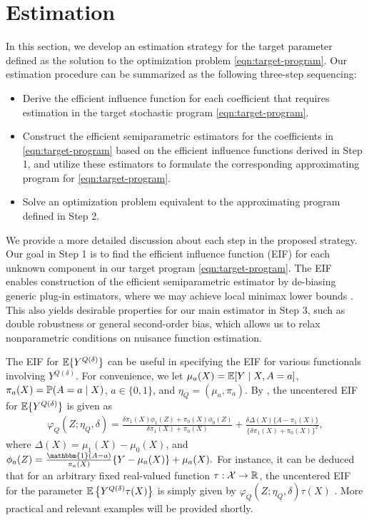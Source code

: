 \section{Estimation}

In this section, we develop an estimation strategy for the target parameter defined as the solution to the optimization problem \eqref{eqn:target-program}. Our estimation procedure can be summarized as the following three-step sequencing:
\begin{itemize}
    \item [\textbf{Step 1.}] Derive the efficient influence function for each coefficient that requires estimation in the target stochastic program \eqref{eqn:target-program}.
    \item [\textbf{Step 2.}] Construct the efficient semiparametric estimators for the coefficients in \eqref{eqn:target-program} based on the efficient influence functions derived in Step 1, and utilize these estimators to formulate the corresponding approximating program for \eqref{eqn:target-program}.
    \item [\textbf{Step 3.}] Solve an optimization problem equivalent to the approximating program defined in Step 2.
\end{itemize}

We provide a more detailed discussion about each step in the proposed strategy. Our goal in Step 1 is to find the efficient influence function (EIF) for each unknown component in our target program \eqref{eqn:target-program}. 
The EIF enables construction of the efficient semiparametric estimator by de-biasing generic plug-in estimators, where we may achieve local minimax lower bounds \citep{bickel1993efficient, van2002semiparametric,tsiatis2006semiparametric,kennedy2016semiparametric}. This also yields desirable properties for our main estimator in Step 3, such as double robustness or general second-order bias, which allows us to relax nonparametric conditions on nuisance function estimation. 

The EIF for $\mathbb{E}\{Y^{Q(\delta)}\}$ can be useful in specifying the EIF for various functionals involving $Y^{Q(\delta)}$. For convenience, we let $\mu_a(X) = \mathbb{E}[Y \mid X,A=a]$, $\pi_a(X) = \mathbb{P}(A=a \mid X)$, $a \in \{0,1\}$, and $\eta_Q=(\mu_a,\pi_a)$. By \citet[][Theorem 2]{kennedy2019nonparametric}, the uncentered EIF for $\mathbb{E}\{Y^{Q(\delta)}\}$ is given as
\begin{align} \label{eqn:EIF-incremental-effect}
\varphi_Q(Z;\eta_Q,\delta) = \frac{\delta \pi_1(X) \phi_1(Z) +  \pi_0(X)\phi_0(Z)}{\delta \pi_1(X) + \pi_0(X)}
+ \frac{\delta \Delta(X) \{ A - \pi_1(X) \}}{\{ \delta \pi_1(X) + \pi_0(X) \}^2},
\end{align}
where $\Delta(X) = \mu_1(X) - \mu_0(X)$, and
$
\phi_a(Z) = \frac{\mathbbm{1}(A = a)}{\pi_a(X)} \{ Y - \mu_a(X) \} + \mu_a(X).
$
For instance, it can be deduced that for an arbitrary fixed real-valued function $\tau:\mathcal{X} \rightarrow \mathbb{R}$, the uncentered EIF for the parameter $\mathbb{E}\left\{Y^{Q(\delta)}\tau(X)\right\}$ is simply given by $\varphi_Q(Z;\eta_Q,\delta)\tau(X)$ \citep[][Lemma A.1]{kim2022doubly}. More practical and relevant examples will be provided shortly.

